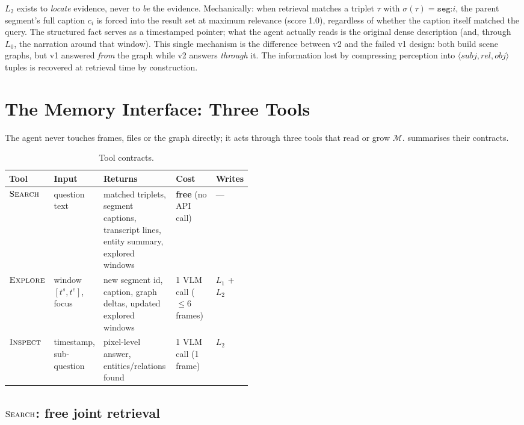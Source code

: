 $L_2$ exists to \emph{locate} evidence, never to \emph{be} the evidence. Mechanically: when retrieval
matches a triplet $\tau$ with $\sigma(\tau) = \texttt{seg:}i$, the parent segment's full caption
$c_i$ is forced into the result set at maximum relevance (score 1.0), regardless of whether the
caption itself matched the query. The structured fact serves as a timestamped pointer; what the
agent actually reads is the original dense description (and, through $L_0$, the narration around
that window). This single mechanism is the difference between v2 and the failed v1 design: both
build scene graphs, but v1 answered \emph{from} the graph while v2 answers \emph{through} it. The
information lost by compressing perception into $\langle \mathit{subj}, \mathit{rel},
\mathit{obj}\rangle$ tuples is recovered at retrieval time by construction.

\section{The Memory Interface: Three Tools}
\label{sec:tools}

The agent never touches frames, files or the graph directly; it acts through three tools that
read or grow $\mathcal{M}$.  summarises their contracts.

\begin{table}[t]
  \centering
  \footnotesize
  \caption{Tool contracts.}
  \label{tab:tools}
  \setlength{\tabcolsep}{4pt}
  \begin{tabular}{@{}llp{0.30\linewidth}p{0.17\linewidth}l@{}}
    \toprule
    Tool & Input & Returns & Cost & Writes \\
    \midrule
    $\textsc{Search}$ & question text & matched triplets, segment captions, transcript lines, entity summary, explored windows & \textbf{free} (no API call) & --- \\
    $\textsc{Explore}$ & window $[t^{s}, t^{e}]$, focus & new segment id, caption, graph deltas, updated explored windows & 1 VLM call ($\leq 6$ frames) & $L_1$ + $L_2$ \\
    $\textsc{Inspect}$ & timestamp, sub-question & pixel-level answer, entities/relations found & 1 VLM call (1 frame) & $L_2$ \\
    \bottomrule
  \end{tabular}
\end{table}

\subsection{$\textsc{Search}$: free joint retrieval}
\label{subsec:search}

